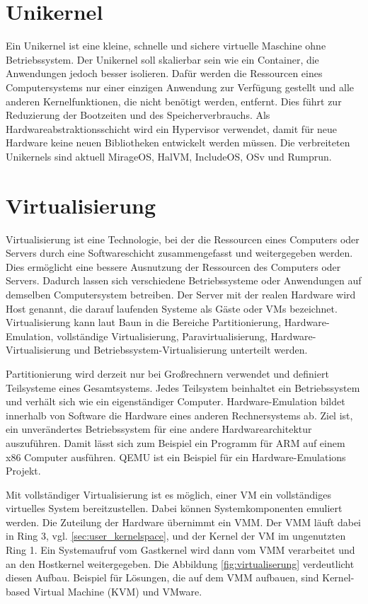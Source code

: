 \section{Unikernel}
\label{sec:unikernel}
Ein Unikernel ist eine kleine, schnelle und sichere virtuelle Maschine ohne Betriebssystem. Der Unikernel soll skalierbar sein wie ein Container, die Anwendungen jedoch besser isolieren. Dafür werden die Ressourcen eines Computersystems nur einer einzigen Anwendung zur Verfügung gestellt und alle anderen Kernelfunktionen, die nicht benötigt werden, entfernt. Dies führt zur Reduzierung der Bootzeiten und des Speicherverbrauchs. 
Als Hardwareabstraktionsschicht wird ein Hypervisor verwendet, damit für neue Hardware keine neuen Bibliotheken entwickelt werden müssen.
Die verbreiteten Unikernels sind aktuell MirageOS, HalVM, IncludeOS, OSv und Rumprun. \cite[vgl.][256]{Jaworski.2020}

\section{Virtualisierung}
\label{sec:virtualiserung}

Virtualisierung ist eine Technologie, bei der die Ressourcen eines Computers oder Servers durch eine Softwareschicht zusammengefasst und weitergegeben werden. Dies ermöglicht eine bessere Ausnutzung der Ressourcen des Computers oder Servers. Dadurch lassen sich verschiedene Betriebssysteme oder Anwendungen auf demselben Computersystem betreiben. Der Server mit der realen Hardware wird Host genannt, die darauf laufenden Systeme als Gäste oder \acp{VM} bezeichnet. Virtualisierung kann laut Baun in die Bereiche Partitionierung, Hardware-Emulation, vollständige Virtualisierung, Paravirtualisierung, Hardware-Virtualisierung und Betriebssystem-Virtualisierung unterteilt werden. \cite[vgl.][231]{Baun.2017}

Partitionierung wird derzeit nur bei Großrechnern verwendet und definiert Teilsysteme eines Gesamtsystems. Jedes Teilsystem beinhaltet ein Betriebssystem und verhält sich wie ein eigenständiger Computer. Hardware-Emulation bildet innerhalb von Software die Hardware eines anderen Rechnersystems ab. Ziel ist, ein unverändertes Betriebssystem für eine andere Hardwarearchitektur auszuführen. Damit lässt sich zum Beispiel ein Programm für ARM auf einem x86 Computer ausführen. QEMU ist ein Beispiel für ein Hardware-Emulations Projekt. \cite[vgl.][233]{Baun.2017}

Mit vollständiger Virtualisierung ist es möglich, einer \ac{VM} ein vollständiges virtuelles System bereitzustellen. Dabei können Systemkomponenten emuliert werden. Die Zuteilung der Hardware übernimmt ein \ac{VMM}. Der \ac{VMM} läuft dabei in Ring 3, vgl. \ref{sec:user_kernelspace}, und der Kernel der \ac{VM} im ungenutzten Ring 1. Ein Systemaufruf vom Gastkernel wird dann vom \ac{VMM} verarbeitet und an den Hostkernel weitergegeben. Die Abbildung \ref{fig:virtualiserung} verdeutlicht diesen Aufbau. Beispiel für Lösungen, die auf dem \ac{VMM} aufbauen, sind Kernel-based Virtual Machine (KVM) und VMware. \cite[vgl.][S. 236 f.]{Baun.2017}

